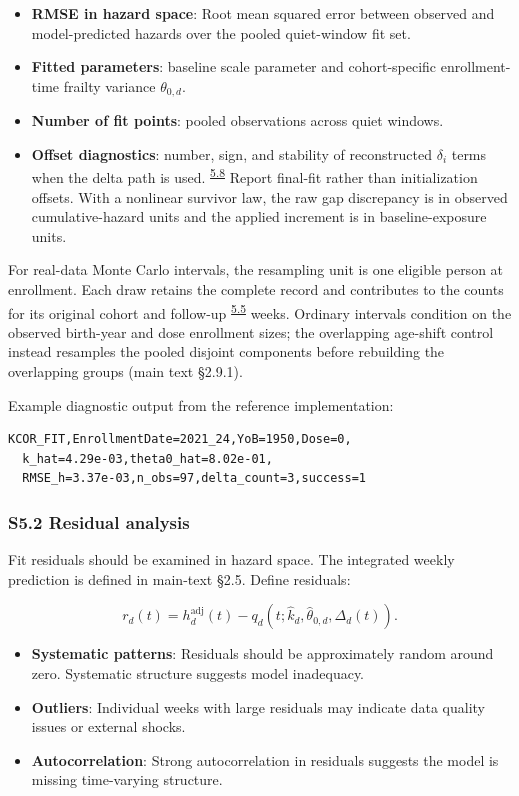 \documentclass[
]{article}
\providecommand{\tightlist}{%
  \setlength{\itemsep}{0pt}\setlength{\parskip}{0pt}}
\DeclareRobustCommand{\oldword}[1]{\leavevmode{\setbox0=\hbox{#1}\rlap{\raisebox{.5ex}{\rule{\wd0}{.45pt}}}\box0\relax}}
\begin{document}
\begin{itemize}
\tightlist
\item
  \textbf{RMSE in hazard space}: Root mean squared error between observed and model-predicted hazards over the pooled quiet-window fit set.
\item
  \textbf{Fitted parameters}: baseline scale parameter and cohort-specific enrollment-time frailty variance \(\theta_{0,d}\).
\item
  \textbf{Number of fit points}: pooled observations across quiet windows.
\item
\textbf{Offset diagnostics}: number, sign, and stability of reconstructed \(\delta_i\) terms when the delta path is used. \textsuperscript{\hyperlink{issue-5.8}{5.8}}  {\color{red}Report final-fit rather than initialization offsets. With a nonlinear survivor law, the raw gap discrepancy is in observed cumulative-hazard units and the applied increment is in baseline-exposure units.}
\end{itemize}

For real-data Monte Carlo intervals, the resampling unit is one eligible person at enrollment. Each draw retains the complete record and contributes to the counts for its original cohort and follow-up \textsuperscript{\hyperlink{issue-5.5}{5.5}}  \oldword{weeks} {\color{red}weeks. Ordinary intervals condition on the observed birth-year and dose enrollment sizes; the overlapping age-shift control instead resamples the pooled disjoint components before rebuilding the overlapping groups} (main text §2.9.1).

Example diagnostic output from the reference implementation:

\begin{verbatim}
KCOR_FIT,EnrollmentDate=2021_24,YoB=1950,Dose=0,
  k_hat=4.29e-03,theta0_hat=8.02e-01,
  RMSE_h=3.37e-03,n_obs=97,delta_count=3,success=1
\end{verbatim}

\subsubsection{S5.2 Residual analysis}\label{s5.2-residual-analysis}

Fit residuals should be examined in hazard space. The integrated weekly prediction is defined in main-text §2.5. Define residuals:

\[r_{d}(t)=h_d^{\mathrm{adj}}(t)-q_d(t;\hat{k}_d,\hat{\theta}_{0,d},\Delta_d(t)).\]

\begin{itemize}
\tightlist
\item
  \textbf{Systematic patterns}: Residuals should be approximately random around zero. Systematic structure suggests model inadequacy.
\item
  \textbf{Outliers}: Individual weeks with large residuals may indicate data quality issues or external shocks.
\item
  \textbf{Autocorrelation}: Strong autocorrelation in residuals suggests the model is missing time-varying structure.
\end{itemize}
\end{document}
